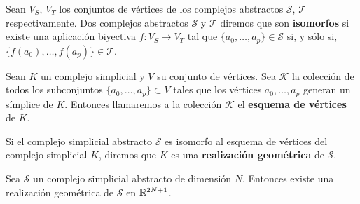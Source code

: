 Sean \(V_{S}\), \(V_{T}\) los conjuntos de vértices de los complejos abstractos \(\mathcal{S}\),
\(\mathcal{T}\) respectivamente. Dos complejos abstractos \(\mathcal{S}\) y \(\mathcal{T}\)
diremos que son \textbf{isomorfos} si existe una aplicación biyectiva
\(f: V_{S}\rightarrow V_{T}\) tal que \(\{a_{0}, \ldots, a_{p}\} \in \mathcal{S}\) si,
y sólo si, \(\{f(a_{0}), \ldots, f(a_{p})\} \in \mathcal{T}\).

\begin{definicion}
	Sean \(K\) un complejo simplicial y \(V\) su conjunto de vértices. Sea
	\(\mathcal{K}\) la colección de todos los subconjuntos
	\(\{a_{0}, \ldots, a_{p}\} \subset V\) tales que los vértices
	\(a_{0}, \ldots, a_{p}\) generan un símplice de \(K\). Entonces llamaremos a la colección
	\(\mathcal{K}\) el \textbf{esquema de vértices} de \(K\).
\end{definicion}
\begin{definicion}
	Si el complejo simplicial abstracto \(\mathcal{S}\) es isomorfo al esquema de vértices
	del complejo simplicial \(K\), diremos que \(K\) es una \textbf{realización
	geométrica} de \(\mathcal{S}\).
\end{definicion}
\begin{proposicion}
	Sea \(\mathcal{S}\) un complejo simplicial abstracto de dimensión \(N\). Entonces
	existe una realización geométrica de \(\mathcal{S}\) en \(\mathbb{R}^{2N+1}\).
\end{proposicion}
